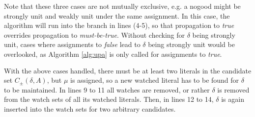 \documentclass{vutinfth} %
\newcommand{\mbt}{must-be-true\xspace}
\newcommand{\bT}{\mathbf{T}}
\newcommand{\cdpm}{C_\pm}
\newcommand{\sgl}{\mu}
\begin{document}
Note that these three cases are not mutually exclusive, e.g. a nogood might be strongly unit and weakly unit under the same assignment. In this case, the algorithm will run into the branch in lines (4-5), so that propagation to \emph{true} overrides propagation to \emph{\mbt}. Without checking for $\delta$ being strongly unit, cases where assignments to \emph{false} lead to $\delta$ being strongly unit would be overlooked, as Algorithm \ref{alg:upa} is only called for assignments to \emph{true}.

With the above cases handled, there must be at least two literals in the candidate set $\cdpm(\delta, A)$, but $\sgl$ is assigned, so a new watched literal has to be found for $\delta$ to be maintained. In lines 9 to 11 all watches are removed, or rather $\delta$ is removed from the watch sets of all its watched literals. Then, in lines 12 to 14, $\delta$ is again inserted into the watch sets for two arbitrary candidates.
 

\end{document}
